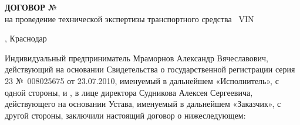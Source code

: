%


%

	
	\def\цена{25000}
	
%	
\sloppy  %
%
\pagestyle{plain}
\pagestyle{fancy}

%
%
%
%

%
%
\thispagestyle{empty}  %
%


%
\begin{center}
	\textbf{{\large  ДОГОВОР № \NomerDoc}}\\
	на проведение  технической экспертизы транспортного средства  \, VIN \vin
\end{center}
\vspace{-6mm}
\begin{flushright}
	\hfill	 \dog,   Краснодар \\[8mm]
\end{flushright} 
\vspace{-6mm}
Индивидуальный предприниматель Мраморнов Александр Вячеславович, действующий на основании Свидетельства о государственной регистрации серия 23 №~008025675 от 23.07.2010, именуемый в дальнейшем «Исполнитель», с одной стороны, и , в лице директора Судникова Алексея Сергеевича, действующего на основании Устава, именуемый в дальнейшем «Заказчик», с другой стороны, заключили настоящий договор о нижеследующем:


